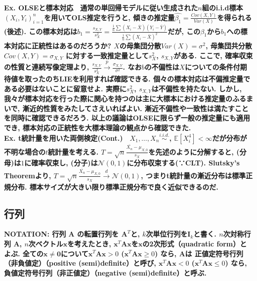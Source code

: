 \documentclass[paper=a4paper,fontsize=10pt]{jlreq}
\begin{document}
\rmfamily\mcfamily\bfseries{Ex. OLSEと標本対応}\mdseries　通常の単回帰モデルに従い生成された$n$組のi.i.d標本$(X_i, Y_i)_{i=1}^{n}$を用いてOLS推定を行うと, 傾きの推定量$\hat{\beta_1}=\frac{Cov(X,Y)}{Var(X)}$を得られる(後述). この\rmfamily\mcfamily\bfseries{標本対応}\mdseries は$b_1=\frac{s_{X,Y}}{s^{2}_{X}}=\frac{\frac{1}{n}\sum{(X_{i}-\bar{X})(Y_{i}-\bar{Y})}}{\frac{1}{n}\sum{(X_{i}-\bar{X})^2}}$だが, この$\beta_1$から$b_1$への標本対応に正統性はあるのだろうか? $X$の母集団分散$Var(X)=\sigma^2$, 母集団共分散$Cov(X,Y)=\sigma_{X,Y}$ に対する一致推定量として$s^2_X$, $s_{X,Y}$がある. ここで, 確率収束の性質と連続写像定理より, $\frac{s_{X,Y}}{s^{2}_{X}} \overset{p}{\to} \frac{\sigma_{X,Y}}{\sigma^2}$. なお$b$の不偏性は$X$についての条件付期待値を取ったのちLIEを利用すれば確認できる. 個々の標本対応は不偏推定量である必要はないことに留意せよ. 実際に$s^2_X$, $s_{X,Y}$は不偏性を持たない. しかし, 我々が標本対応を行った際に関心を持つのは主に大標本における推定量のふるまいで, \rmfamily\mcfamily\bfseries{漸近的性質をみたしてさえいればよい}\mdseries . 漸近不偏性や一致性は満たすことを同時に確認できるだろう. 以上の議論はOLSEに限らず一般の推定量にも適用でき, 標本対応の正統性を大標本理論の観点から確認できた.\\

\rmfamily\mcfamily\bfseries{Ex. t統計量を用いた両側検定(Cont.)}\mdseries　$X_1, \dots, X_n \overset{i.i.d.}{\sim}$, $\mathbb{E}[X_i^4]<\infty$だが分布が不明な場合の$t$統計量を考える. $T=\sqrt{n} \frac{\bar{X_n}-\mu_{X,0}}{s_X}$を先述のように分解すると, (分母)は$1$に確率収束し, (分子)は$\mathcal{N}(0,1)$に分布収束する(∵CLT). Slutsky's Theoremより, $T=\sqrt{n} \frac{\bar{X_n}-\mu_{X,0}}{s_X} \overset{d}{\to} \mathcal{N}(0, 1)$, つまり\rmfamily\mcfamily\bfseries{t統計量の漸近分布は標準正規分布}\mdseries . 標本サイズが大きい限り標準正規分布で良く近似できるのだ.\\

\subsection{行列}
\rmfamily\mcfamily\bfseries{NOTATION}\mdseries : 行列 $\mathbf{A}$ の転置行列を $\mathbf{A}^{T}$と, $k$次単位行列を$\mathbf{I}_k$と書く. $n$次対称行列 $\mathbf{A}$, $n$次ベクトル$\mathbf{x}$を考えたとき, $\mathbf{x}^T\mathbf{A}\mathbf{x}$を$\mathbf{x}$の\rmfamily\mcfamily\bfseries{2次形式（quadratic form）}\mdseries とよぶ. 全ての$\mathbf{x} \neq  \mathbf{0}$について$\mathbf{x}^T\mathbf{A}\mathbf{x}>0$ ($\mathbf{x}^T\mathbf{A}\mathbf{x}\geq 0$) なら, $\mathbf{A}$は \rmfamily\mcfamily\bfseries{正値定符号行列（非負値定）（positive (semi)definite）}\mdseries と呼び,  $\mathbf{x}^T\mathbf{A}\mathbf{x}<0$ ($\mathbf{x}^T\mathbf{A}\mathbf{x}\leq0$) なら, \rmfamily\mcfamily\bfseries{負値定符号行列（非正値定）（negative (semi)definite）}\mdseries と呼ぶ. \\
\end{document}

